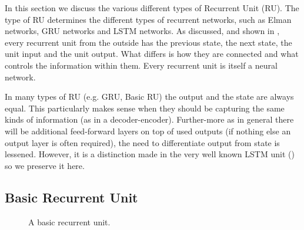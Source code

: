 \documentclass[12pt,parskip]{komatufte}
\begin{document}
In this section we discuss the various different types of Recurrent Unit (RU).
The type of RU determines the different types of recurrent networks, such as Elman networks, GRU networks and LSTM networks.
As discussed, and shown in , every recurrent unit from the outside has the previous state, the next state, the unit input and the unit output.
What differs is how they are connected and what controls the information within them.
Every recurrent unit is itself a neural network.

In many types of RU (e.g. GRU, Basic RU) the output and the state are always equal.
This particularly makes sense when they should be capturing the same kinds of information (as in a decoder-encoder).
Further-more as in general there will be additional feed-forward layers on top of used outputs (if nothing else an output layer is often required), the need to differentiate output from state is lessened.
However, it is a distinction made in the very well known LSTM unit () so we preserve it here.



\subsection{Basic Recurrent Unit}

\begin{figure}
	\caption{A basic recurrent unit.}
	\label{fig:basicrnn}
\end{figure}

\end{document}
